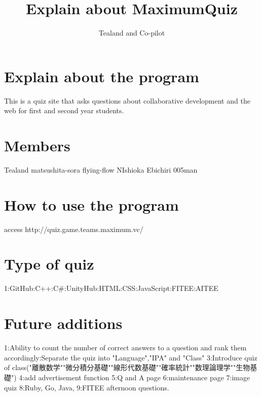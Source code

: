 \documentclass{article}%
\title{Explain about MaximumQuiz}  %
\author{Tealand and Co-pilot}
\begin{document}
\maketitle

\section{Explain about the program}

This is a quiz site that asks questions about collaborative development and the web for first and second year students.


\section{Members}

Tealand\newline
matsushita-sora\newline
flying-flow\newline
NIshioka\newline
Ebichiri\newline
005man\newline

\section{How to use the program}

access http://quiz.game.teams.maximum.vc/

\section{Type of quiz}

1:GitHub:C++:C#:UnityHub:HTML:CSS:JavaScript:FITEE:AITEE\newline

\section{Future additions}
1:Ability to count the number of correct answers to a question and rank them accordingly:Separate the quiz into "Language","IPA" and "Class" 
3:Introduce quiz of class("離散数学""微分積分基礎""線形代数基礎""確率統計""数理論理学""生物基礎")
4:add advertisement function
5:Q and A page
6:maintenance page
7:image quiz
8:Ruby, Go, Java, 
9:FITEE afternoon questions.
\end{document}
